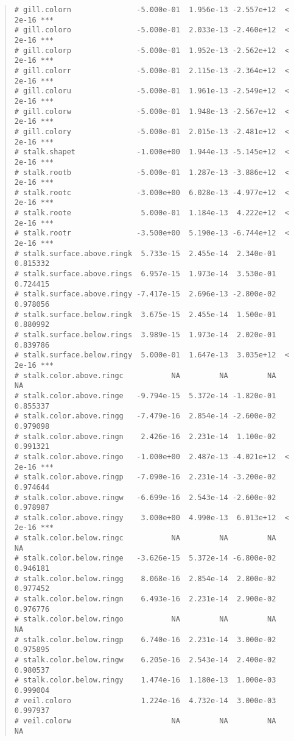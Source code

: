 \documentclass[12pt]{article}
\begin{document}
\begin{quote}
\begin{verbatim}
# gill.colorn               -5.000e-01  1.956e-13 -2.557e+12  < 2e-16 ***
# gill.coloro               -5.000e-01  2.033e-13 -2.460e+12  < 2e-16 ***
# gill.colorp               -5.000e-01  1.952e-13 -2.562e+12  < 2e-16 ***
# gill.colorr               -5.000e-01  2.115e-13 -2.364e+12  < 2e-16 ***
# gill.coloru               -5.000e-01  1.961e-13 -2.549e+12  < 2e-16 ***
# gill.colorw               -5.000e-01  1.948e-13 -2.567e+12  < 2e-16 ***
# gill.colory               -5.000e-01  2.015e-13 -2.481e+12  < 2e-16 ***
# stalk.shapet              -1.000e+00  1.944e-13 -5.145e+12  < 2e-16 ***
# stalk.rootb               -5.000e-01  1.287e-13 -3.886e+12  < 2e-16 ***
# stalk.rootc               -3.000e+00  6.028e-13 -4.977e+12  < 2e-16 ***
# stalk.roote                5.000e-01  1.184e-13  4.222e+12  < 2e-16 ***
# stalk.rootr               -3.500e+00  5.190e-13 -6.744e+12  < 2e-16 ***
# stalk.surface.above.ringk  5.733e-15  2.455e-14  2.340e-01 0.815332    
# stalk.surface.above.rings  6.957e-15  1.973e-14  3.530e-01 0.724415    
# stalk.surface.above.ringy -7.417e-15  2.696e-13 -2.800e-02 0.978056    
# stalk.surface.below.ringk  3.675e-15  2.455e-14  1.500e-01 0.880992    
# stalk.surface.below.rings  3.989e-15  1.973e-14  2.020e-01 0.839786    
# stalk.surface.below.ringy  5.000e-01  1.647e-13  3.035e+12  < 2e-16 ***
# stalk.color.above.ringc           NA         NA         NA       NA    
# stalk.color.above.ringe   -9.794e-15  5.372e-14 -1.820e-01 0.855337    
# stalk.color.above.ringg   -7.479e-16  2.854e-14 -2.600e-02 0.979098    
# stalk.color.above.ringn    2.426e-16  2.231e-14  1.100e-02 0.991321    
# stalk.color.above.ringo   -1.000e+00  2.487e-13 -4.021e+12  < 2e-16 ***
# stalk.color.above.ringp   -7.090e-16  2.231e-14 -3.200e-02 0.974644    
# stalk.color.above.ringw   -6.699e-16  2.543e-14 -2.600e-02 0.978987    
# stalk.color.above.ringy    3.000e+00  4.990e-13  6.013e+12  < 2e-16 ***
# stalk.color.below.ringc           NA         NA         NA       NA    
# stalk.color.below.ringe   -3.626e-15  5.372e-14 -6.800e-02 0.946181    
# stalk.color.below.ringg    8.068e-16  2.854e-14  2.800e-02 0.977452    
# stalk.color.below.ringn    6.493e-16  2.231e-14  2.900e-02 0.976776    
# stalk.color.below.ringo           NA         NA         NA       NA    
# stalk.color.below.ringp    6.740e-16  2.231e-14  3.000e-02 0.975895    
# stalk.color.below.ringw    6.205e-16  2.543e-14  2.400e-02 0.980537    
# stalk.color.below.ringy    1.474e-16  1.180e-13  1.000e-03 0.999004    
# veil.coloro                1.224e-16  4.732e-14  3.000e-03 0.997937    
# veil.colorw                       NA         NA         NA       NA    

\end{verbatim}
\end{quote}
\end{document}
